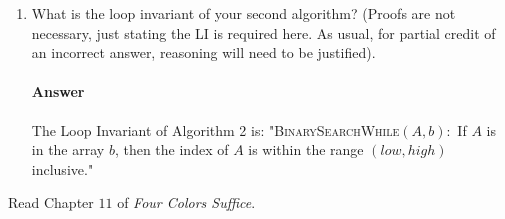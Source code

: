 \documentclass{article}
\begin{document}
\begin{enumerate}
    \item What is the loop invariant of your second algorithm? (Proofs are not
        necessary, just stating the LI is required here.  As usual, for partial
        credit of an incorrect answer, reasoning will need to be justified).

        \paragraph{Answer}

        The Loop Invariant of Algorithm 2 is: "\textsc{BinarySearchWhile}$(A, b):$ If $A$ is in the array $b$, then the index of $A$ is within the range $(low, high)$ inclusive."
\end{enumerate}

\collab{} 

Read Chapter $11$ of \emph{Four Colors Suffice}.
\end{document}
